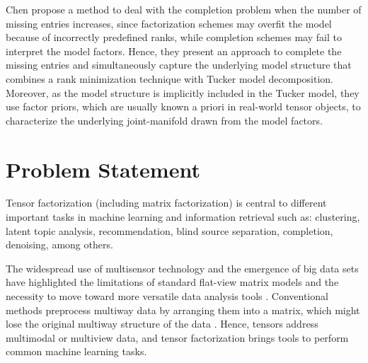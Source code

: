 \documentclass[letterpaper,12pt]{article}
\begin{document}
Chen \cite{Chen2014} propose a method to deal with the completion problem when the number of missing entries increases, since factorization schemes may overfit the model because of incorrectly predefined ranks, while completion schemes may fail to interpret the model factors.  
Hence, they present an approach to complete the missing entries and simultaneously capture the underlying model structure that combines a rank minimization technique with Tucker model decomposition. Moreover, as the model structure is implicitly included in the Tucker model, they  use factor priors, which are usually known a priori in real-world tensor objects, to characterize the underlying joint-manifold drawn from the model factors.





\section{Problem Statement}


Tensor factorization (including matrix factorization) is central to different important tasks in machine learning and information retrieval such as: clustering, latent topic analysis, recommendation, blind source separation, completion, denoising, among others. 

The widespread use of multisensor technology and the emergence of big data sets have highlighted the limitations of standard flat-view matrix models and the necessity to move toward more versatile data analysis tools \cite{Cichocki2015}. Conventional methods preprocess multiway data by arranging them into a matrix, which might lose the original multiway structure of the data  \cite{Wang2013}. Hence, tensors address multimodal or multiview data, and tensor factorization brings tools to perform common machine learning tasks.%

\end{document}
